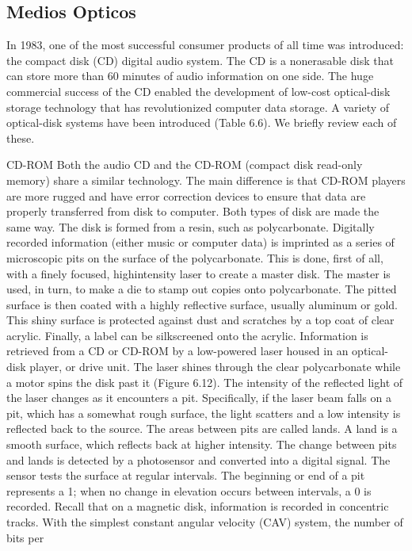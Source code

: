 \subsection{Medios Opticos}
In 1983, one of the most successful consumer products of all time was introduced:
the compact disk (CD) digital audio system. The CD is a nonerasable disk that can
store more than 60 minutes of audio information on one side. The huge commercial
success of the CD enabled the development of low-cost optical-disk storage
technology that has revolutionized computer data storage. A variety of optical-disk
systems have been introduced (Table 6.6). We briefly review each of these.

CD-ROM Both the audio CD and the CD-ROM (compact disk read-only
memory) share a similar technology. The main difference is that CD-ROM players
are more rugged and have error correction devices to ensure that data are properly
transferred from disk to computer. Both types of disk are made the same way. The
disk is formed from a resin, such as polycarbonate. Digitally recorded information
(either music or computer data) is imprinted as a series of microscopic pits on the
surface of the polycarbonate. This is done, first of all, with a finely focused, highintensity
laser to create a master disk. The master is used, in turn, to make a die to
stamp out copies onto polycarbonate. The pitted surface is then coated with a highly
reflective surface, usually aluminum or gold. This shiny surface is protected against
dust and scratches by a top coat of clear acrylic. Finally, a label can be silkscreened
onto the acrylic.
Information is retrieved from a CD or CD-ROM by a low-powered laser
housed in an optical-disk player, or drive unit. The laser shines through the clear
polycarbonate while a motor spins the disk past it (Figure 6.12). The intensity of
the reflected light of the laser changes as it encounters a pit. Specifically, if the laser
beam falls on a pit, which has a somewhat rough surface, the light scatters and a low
intensity is reflected back to the source. The areas between pits are called lands.
A land is a smooth surface, which reflects back at higher intensity. The change
between pits and lands is detected by a photosensor and converted into a digital
signal. The sensor tests the surface at regular intervals. The beginning or end of
a pit represents a 1; when no change in elevation occurs between intervals, a 0 is
recorded.
Recall that on a magnetic disk, information is recorded in concentric tracks.
With the simplest constant angular velocity (CAV) system, the number of bits per
